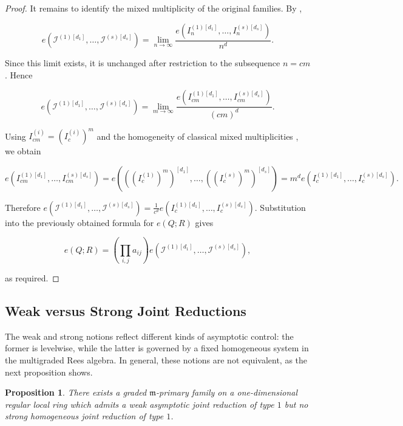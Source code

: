 \documentclass[reqno,12pt]{amsart}
\theoremstyle{plain}
\newtheorem{prop}{Proposition}[section]
\theoremstyle{definition}
\theoremstyle{remark}
\numberwithin{equation}{section}
\begin{document}
\begin{proof}
It remains to identify the mixed multiplicity of the original families.
By \cite[Equation~(9)]{Cutkosky2026},

$$
e\!\left(
\mathcal I^{(1)[d_1]},\ldots,
\mathcal I^{(s)[d_s]}
\right)
=
\lim_{n\to\infty}
\frac{
e(I_n^{(1)[d_1]},\ldots,I_n^{(s)[d_s]})
}{n^d}.
$$

Since this limit exists, it is unchanged after restriction to the
subsequence $n=cm$. Hence

$$
e\!\left(
\mathcal I^{(1)[d_1]},\ldots,
\mathcal I^{(s)[d_s]}
\right)
=
\lim_{m\to\infty}
\frac{
e(I_{cm}^{(1)[d_1]},\ldots,I_{cm}^{(s)[d_s]})
}{(cm)^d}.
$$

Using $I_{cm}^{(i)}=(I_c^{(i)})^m$ and the homogeneity of classical
mixed multiplicities
\cite[Theorem~17.4.2 and Definition~17.4.3]{SwansonHuneke}, we obtain

\[
e(I_{cm}^{(1)[d_1]},\ldots,I_{cm}^{(s)[d_s]})
=
e\!\left(((I_c^{(1)})^m)^{[d_1]},\ldots,((I_c^{(s)})^m)^{[d_s]}\right)
=
m^d e\!\left(I_c^{(1)[d_1]},\ldots,I_c^{(s)[d_s]}\right).
\]

Therefore
$
e\!\left(
\mathcal I^{(1)[d_1]},\ldots,
\mathcal I^{(s)[d_s]}
\right)
=
\frac{1}{c^d}
e\!\left(
I_c^{(1)[d_1]},\ldots,I_c^{(s)[d_s]}
\right).
$
Substitution into the previously obtained formula for $e(Q;R)$ gives

$$
e(Q;R)
=
\left(\prod_{i,j}a_{ij}\right)
e\!\left(
\mathcal I^{(1)[d_1]},\ldots,
\mathcal I^{(s)[d_s]}
\right),
$$

as required.
\end{proof}




\subsection*{Weak versus Strong Joint Reductions}

The weak and strong notions reflect different kinds of asymptotic
control: the former is levelwise, while the latter is governed by a
fixed homogeneous system in the multigraded Rees algebra. In general,
these notions are not equivalent, as the next proposition shows.
\begin{prop}
\label{prop:weak-not-strong}
There exists a graded $\mathfrak m$-primary family on a one-dimensional
regular local ring which admits a weak asymptotic joint reduction of type
$1$ but no strong homogeneous joint reduction of type $1$.
\end{prop}
\end{document}
